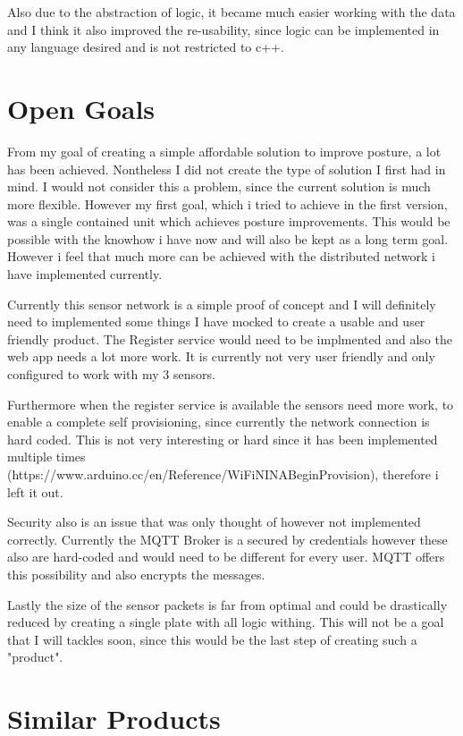 Also due to the abstraction of logic, it became much easier working with the data and I think it also improved the re-usability, since logic can be implemented in any language desired and is not restricted to c++.

\section{Open Goals}

From my goal of creating a simple affordable solution to improve posture, a lot has been achieved. Nontheless I did not create the type of solution I first had in mind. I would not consider this a problem, since the current solution is much more flexible. However my first goal, which i tried to achieve in the first version, was a single contained unit which achieves posture improvements. This would be possible with the knowhow i have now and will also be kept as a long term goal. However i feel that much more can be achieved with the distributed network i have implemented currently. 

Currently this sensor network is a simple proof of concept and I will definitely need to implemented some things I have mocked to create a usable and user friendly product.  The Register service would need to be implmented and also the web app needs a lot more work. It is currently not very user friendly and only configured to work with my 3 sensors. 

Furthermore when the register service is available the sensors need more work, to enable a complete self provisioning, since currently the network connection is hard coded. This is not very interesting or hard since it has been implemented multiple times (https://www.arduino.cc/en/Reference/WiFiNINABeginProvision), therefore i left it out. 

Security also is an issue that was only thought of however not implemented correctly. Currently the MQTT Broker is a secured by credentials however these also are hard-coded and would need to be different for every user. MQTT offers this possibility and also encrypts the messages.

Lastly the size of the sensor packets is far from optimal and could be drastically reduced by creating a single plate with all logic withing. This will not be a goal that I will tackles soon, since this would be the last step of creating such a "product".

\section{Similar Products}

